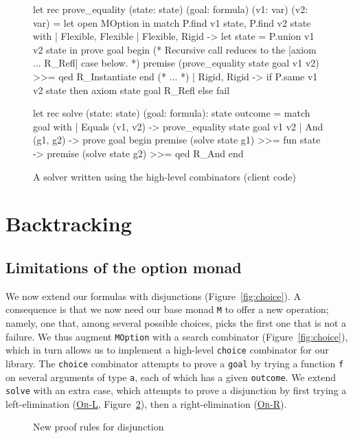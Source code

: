 \documentclass{easychair}
\def\li{\lstinline}
\let\TirName\textsc
\renewcommand{\DefTirName}[1]{\hyperlink{#1}{\TirName {#1}}}
\let\Rule\DefTirName
\newcommand{\fref}[1]{Figure~\ref{fig:#1}}
\begin{document}
\begin{figure}
  \centering
\begin{ocaml}
let rec prove_equality (state: state) (goal: formula) (v1: var) (v2: var) =
  let open MOption in
  match P.find v1 state, P.find v2 state with
  | Flexible, Flexible
  | Flexible, Rigid ->
      let state = P.union v1 v2 state in
      prove goal begin
        (* Recursive call reduces to the [axiom ... R_Refl] case below. *)
        premise (prove_equality state goal v1 v2) >>=
        qed R_Instantiate
      end
  (* ... *)
  | Rigid, Rigid ->
      if P.same v1 v2 state then
        axiom state goal R_Refl
      else
        fail

let rec solve (state: state) (goal: formula): state outcome =
  match goal with
  | Equals (v1, v2) ->
      prove_equality state goal v1 v2
  | And (g1, g2) ->
      prove goal begin
        premise (solve state g1) >>= fun state ->
        premise (solve state g2) >>=
        qed R_And
      end
\end{ocaml}
  \caption{A solver written using the high-level combinators (client code)}
  \label{fig:solver2}
\end{figure}

\section{Backtracking}
\label{sec:backtracking}

\subsection{Limitations of the option monad}

We now extend our formulas with disjunctions (\fref{choice}). A consequence
is that we now need our base monad \li+M+ to offer a new operation; namely, one
that, among several possible choices, picks the first one that is not a failure.
We thus augment \li+MOption+ with a search combinator (\fref{choice}), which in
turn allows us to implement a high-level \li+choice+ combinator for our
library. The \li+choice+ combinator attempts to prove a \li+goal+ by trying a
function \li+f+ on several arguments of type \li+a+, each of which
has a given \li+outcome+. We extend \li+solve+ with an extra case,
which attempts to prove a disjunction by first trying a
left-elimination (\Rule{Or-L}, \fref{proof-system2}), then a right-elimination
(\Rule{Or-R}).

\begin{figure}
  \centering
  \begin{mathpar}

  \end{mathpar}
  \caption{New proof rules for disjunction}
  \label{fig:proof-system2}
\end{figure}
\end{document}
